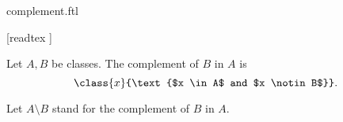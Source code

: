 \documentclass{stex}
\begin{document}
\begin{smodule}{complement.ftl}

  \begin{forthel}

    [readtex ]
  \end{forthel}

  \begin{forthel}
    \begin{definition}
      Let $A, B$ be classes.
      The complement of $B$ in $A$ is
      \[\class{x}{\text{$x \in A$ and $x \notin B$}}.\]
    \end{definition}

    Let $A \setminus B$ stand for the complement of $B$ in $A$.
  \end{forthel}
\end{smodule}
\end{document}
